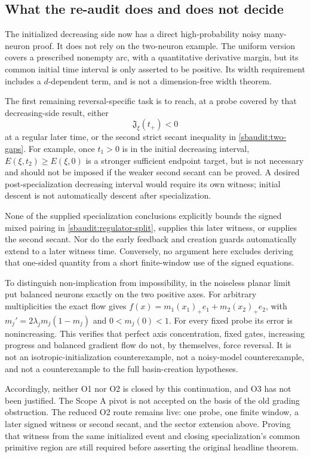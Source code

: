 \documentclass[11pt]{article}
\theoremstyle{remark}
\begin{document}
\subsection{What the re-audit does and does not decide}

The initialized decreasing side now has a direct high-probability noisy
many-neuron proof. It does not rely on the two-neuron example. The uniform
version covers a prescribed nonempty arc, with a quantitative derivative
margin, but its common initial time interval is only asserted to be positive.
Its width requirement
includes a $d$-dependent term, and is not a dimension-free width theorem.

The first remaining reversal-specific task is to reach, at a probe
covered by that decreasing-side result, either
\begin{equation}\label{sbaudit:later-witness}
 \mathfrak J_\xi(t_+)<0
\end{equation}
at a regular later time, or the second strict secant inequality in
\eqref{sbaudit:two-gaps}. For example, once $t_1>0$ is in the initial
decreasing interval, $E(\xi,t_2)\ge E(\xi,0)$ is a stronger sufficient
endpoint target, but is not necessary and should not be imposed if the
weaker second secant can be proved. A desired post-specialization
decreasing interval would require its own witness; initial descent is
not automatically descent after specialization.

None of the supplied specialization conclusions explicitly bounds the
signed mixed pairing in \eqref{sbaudit:regulator-split}, supplies this
later witness, or supplies the second secant. Nor do the early feedback
and creation guards automatically extend to a later witness time.
Conversely, no argument here excludes deriving that one-sided quantity
from a short finite-window use of the signed equations.

To distinguish non-implication from impossibility, in the noiseless
planar limit put balanced neurons exactly on the two positive axes.
For arbitrary multiplicities the exact flow gives
$f(x)=m_1(x_1)_+e_1+m_2(x_2)_+e_2$, with
$m_j'=2\lambda_jm_j(1-m_j)$ and $0<m_j(0)<1$.
For every fixed probe its error is nonincreasing. This verifies that
perfect axis concentration, fixed gates, increasing progress and balanced
gradient flow do not, by themselves, force reversal. It is not an
isotropic-initialization counterexample, not a noisy-model counterexample,
and not a counterexample to the full basin-creation hypotheses.

Accordingly, neither O1 nor O2 is closed by this continuation, and O3
has not been justified. The Scope A pivot is not accepted on the basis
of the old grading obstruction. The reduced O2 route remains live:
one probe, one finite window, a later signed witness or second secant,
and the sector extension above. Proving that witness from the same
initialized event and closing specialization's common primitive region
are still required before asserting the original headline theorem.
\end{document}
